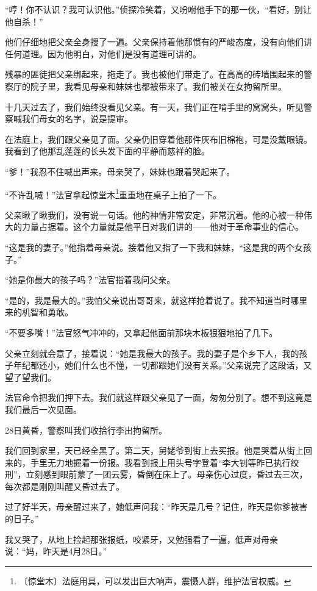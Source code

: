 \documentclass[12pt,UTF-8,openany]{ctexbook}
\begin{document}
\begin{large}
    “哼！你不认识？我可认识他。”侦探冷笑着，又吩咐他手下的那一伙，“看好，别让他自杀！”
    
    他们仔细地把父亲全身搜了一遍。父亲保持着他那惯有的严峻态度，没有向他们讲任何道理。因为他明白，对他们是没有道理可讲的。
    
    残暴的匪徒把父亲绑起来，拖走了。我也被他们带走了。在高高的砖墙围起来的警察厅的院子里，我看见母亲和妹妹也都被带来了。我们被关在女拘留所里。
    
    十几天过去了，我们始终没看见父亲。有一天，我们正在啃手里的窝窝头，听见警察喊我们母女的名字，说是提审。
    
    在法庭上，我们跟父亲见了面。父亲仍旧穿着他那件灰布旧棉袍，可是没戴眼镜。我看到了他那乱蓬蓬的长头发下面的平静而慈祥的脸。
    
    “爹！”我忍不住喊出声来。母亲哭了，妹妹也跟着哭起来了。
    
    “不许乱喊！”法官拿起惊堂木\footnote{〔惊堂木〕法庭用具，可以发出巨大响声，震慑人群，维护法官权威。}重重地在桌子上拍了一下。
    
    父亲瞅了瞅我们，没有说一句话。他的神情非常安定，非常沉着。他的心被一种伟大的力量占据着。这个力量就是他平日对我们讲的——他对于革命事业的信心。
    
    “这是我的妻子。”他指着母亲说。接着他又指了一下我和妹妹，“这是我的两个女孩子。”
    
    “她是你最大的孩子吗？”法官指着我问父亲。
    
    “是的，我是最大的。”我怕父亲说出哥哥来，就这样抢着说了。我不知道当时哪里来的机智和勇敢。
    
    “不要多嘴！”法官怒气冲冲的，又拿起他面前那块木板狠狠地拍了几下。
    
    父亲立刻就会意了，接着说：“她是我最大的孩子。我的妻子是个乡下人，我的孩子年纪都还小，她们什么也不懂，一切都跟她们没有关系。”父亲说完了这段话，又望了望我们。
    
    法官命令把我们押下去。我们就这样跟父亲见了一面，匆匆分别了。想不到这竟是我们最后一次见面。
    
    28日黄昏，警察叫我们收拾行李出拘留所。
    
    我们回到家里，天已经全黑了。第二天，舅姥爷到街上去买报。他是哭着从街上回来的，手里无力地握着一份报。我看到报上用头号字登着“李大钊等昨已执行绞刑”，立刻感到眼前蒙了一团云雾，昏倒在床上了。母亲伤心过度，昏过去三次，每次都是刚刚叫醒又昏过去了。
    
    过了好半天，母亲醒过来了，她低声问我：“昨天是几号？记住，昨天是你爹被害的日子。”
    
    我又哭了，从地上捡起那张报纸，咬紧牙，又勉强看了一遍，低声对母亲说：“妈，昨天是4月28日。”
    
\end{large}
\end{document}
